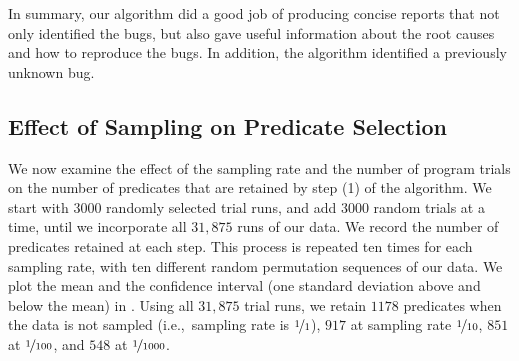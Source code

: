 In summary, our algorithm did a good job of producing concise reports that not
only identified the bugs, but also gave useful information about the root causes and
how to reproduce the bugs.  In addition, the algorithm identified a previously unknown
bug.

\subsection{Effect of Sampling on Predicate Selection}

We now examine the effect of the sampling rate and the number of
program trials on the number of predicates that are retained by step
(1) of the algorithm.
We start with $3000$ randomly
selected trial runs, and add $3000$ random trials at a time, until we
incorporate all $31,875$ runs of our data.  We record the number of
predicates retained at each step.  This process is repeated ten times
for each sampling rate, with ten different random permutation sequences
of our data. We plot the mean and the confidence interval (one
standard deviation above and below the mean) in
.  Using all $31,875$ trial runs, we retain $1178$ 
predicates when the data is not sampled (i.e.,\ sampling rate is 
$\nicefrac{1}{1}$), $917$ at sampling
rate $\nicefrac{1}{10}$, $851$ at $\nicefrac{1}{100}$, and $548$ at
$\nicefrac{1}{1000}$.

